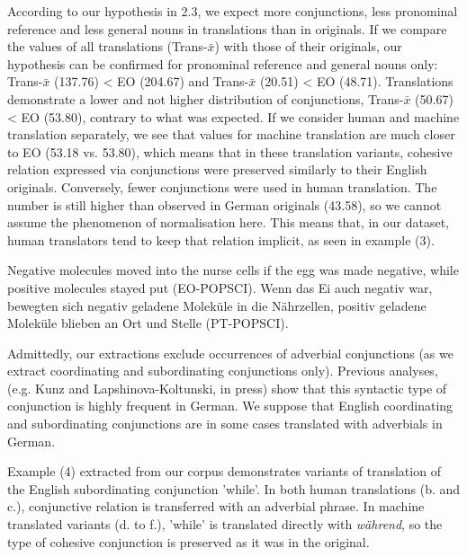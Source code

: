 \documentclass[output=paper]{LSP/langsci}
\begin{document}
According to our hypothesis in 2.3, we expect more conjunctions, less pronominal reference and less general nouns in translations than in originals. If we compare the values of all translations (Trans-$\bar{x}$) with those of their originals, our hypothesis can be confirmed for pronominal reference and general nouns only: Trans-$\bar{x}$ (137.76) < EO (204.67) and Trans-$\bar{x}$ (20.51) < EO (48.71). Translations demonstrate a lower and not higher distribution of conjunctions, Trans-$\bar{x}$ (50.67) < EO (53.80), contrary to what was expected. If we consider human and machine translation separately, we see that values for machine translation are much closer to EO (53.18 vs. 53.80), which means that in these translation variants, cohesive relation expressed via conjunctions were preserved similarly to their English originals. Conversely, fewer conjunctions were used in human translation. The number is still higher than observed in German originals (43.58), so we cannot assume the phenomenon of normalisation here. This means that, in our dataset, human translators tend to keep that relation implicit, as seen in example (3).


\ea
\ea Negative molecules moved into the nurse cells if the egg was made negative, while positive molecules stayed put (EO-POPSCI).
\ex Wenn das Ei auch negativ war, bewegten sich negativ geladene Moleküle in die Nährzellen, positiv geladene Moleküle blieben an Ort und Stelle (PT-POPSCI).
\z
\z


Admittedly, our extractions exclude occurrences of adverbial conjunctions (as we extract coordinating and subordinating conjunctions only). Previous analyses, (e.g. Kunz and Lapshinova-Koltunski, in press) show that this syntactic type of conjunction is highly frequent in German. We suppose that English coordinating and subordinating conjunctions are in some cases translated with adverbials in German. 

Example (4) extracted from our corpus demonstrates variants of translation of the English subordinating conjunction 'while'. In both human translations (b. and c.), conjunctive relation is transferred with an adverbial phrase. In machine translated variants (d. to f.), 'while' is translated directly with \textit{während}, so the type of cohesive conjunction is preserved as it was in the original.\newline
\end{document}
